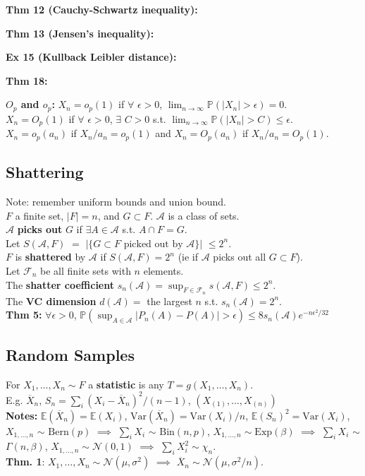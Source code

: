 \documentclass[10pt,twocolumn]{article}
\begin{document}
\textbf{Thm 12 (Cauchy-Schwartz inequality):}

\textbf{Thm 13 (Jensen's inequality):}

\textbf{Ex 15 (Kullback Leibler distance):}

\textbf{Thm 18:}

\textbf{$O_{p}$ and $o_{p}$:} $X_{n} = o_{p}(1)$ if $\forall$ $\epsilon>0$, $\lim_{n\rightarrow\infty} \mathbb{P}(|X_{n}|>\epsilon) = 0$.\\
$X_{n} = O_{p}(1)$ if $\forall$ $\epsilon>0$, $\exists$ $C>0$ s.t. $\lim_{n\rightarrow\infty} \mathbb{P}(|X_{n}|>C) \leq \epsilon$. \\
$X_{n} = o_{p}(a_{n})$ if $X_{n}/a_{n} = o_{p}(1)$ and $X_{n} = O_{p}(a_{n})$ if $X_{n}/a_{n} = O_{p}(1).$

\subsection*{Shattering}
Note: remember uniform bounds and union bound.\\
$F$ a finite set, $|F| = n$, and $G \subset F$. $\mathcal{A}$ is a class of sets.\\
$\mathcal{A}$ \textbf{picks out} $G$ if $\exists A \in \mathcal{A}$ s.t. $A \cap F = G$.\\
Let $S(\mathcal{A},F)$ $=$ $|\{G \subset F \text{ picked out by } \mathcal{A}\}|$ $\leq 2^{n}$.\\
$F$ is \textbf{shattered} by $\mathcal{A}$ if $S(\mathcal{A},F) = 2^{n}$ (ie if $\mathcal{A}$ picks out all $G \subset F$).\\
Let $\mathcal{F}_{n}$ be all finite sets with $n$ elements.\\
The \textbf{shatter coefficient} $s_{n}(\mathcal{A}) = \sup_{F \in \mathcal{F}_{n}} s(\mathcal{A},F) \leq 2^{n}$.\\
The \textbf{VC dimension} $d(\mathcal{A}) =$ the largest $n$ s.t. $s_{n}(\mathcal{A}) = 2^{n}$.\\
\textbf{Thm 5:} $\forall \epsilon>0$, $\mathbb{P}(\sup_{A \in \mathcal{A}} |P_{n}(A) - P(A)| > \epsilon) \leq 8 s_{n}(\mathcal{A})e^{-n\epsilon^{2}/32}$


\subsection*{Random Samples}
For $X_{1},\ldots,X_{n} \sim F$ a \textbf{statistic} is any $T = g(X_{1},\ldots,X_{n})$.\\
E.g. $\overline{X}_{n}$, $S_{n} = \sum_{i}(X_{i}-\overline{X}_{n})^{2} / (n-1)$, $\left(X_{(1)},\ldots,X_{(n)}\right)$\\
\textbf{Notes:} $\mathbb{E}(\overline{X}_{n}) = \mathbb{E}(X_{i})$, $\text{Var}(\overline{X}_{n}) = \text{Var}(X_{i})/n$, $\mathbb{E}(S_{n})^{2} = \text{Var}(X_{i})$, $X_{1,\ldots,n}$ $\sim$ $\text{Bern}(p)$ $\implies$ $\sum_{i} X_{i}$ $\sim$ $\text{Bin}(n,p)$, $X_{1,\ldots,n} \sim \text{Exp}(\beta)$ $\implies$ $\sum_{i}X_{i}$ $\sim$ $\Gamma(n,\beta)$, $X_{1,\ldots,n} \sim \mathcal{N}(0,1)$ $\implies$ $\sum_{i}X_{i}^{2} \sim \chi_{n}$. \\
\textbf{Thm. 1}: $X_{1},\ldots,X_{n} \sim \mathcal{N}(\mu,\sigma^{2})$ $\implies$  $\overline{X}_{n} \sim \mathcal{N}(\mu, \sigma^{2}/n)$.
\end{document}
